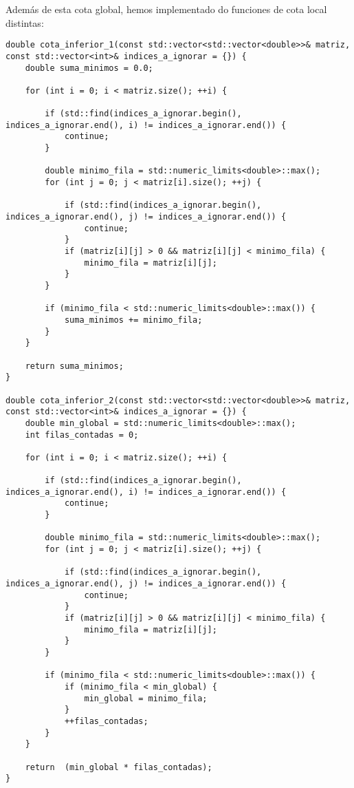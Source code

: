 \documentclass[11pt,openany]{book}
\begin{document}
Además de esta cota global, hemos implementado do funciones de cota local distintas:
\\ 
\begin{lstlisting}
double cota_inferior_1(const std::vector<std::vector<double>>& matriz, const std::vector<int>& indices_a_ignorar = {}) {
    double suma_minimos = 0.0;

    for (int i = 0; i < matriz.size(); ++i) {
        
        if (std::find(indices_a_ignorar.begin(), indices_a_ignorar.end(), i) != indices_a_ignorar.end()) {
            continue;
        }

        double minimo_fila = std::numeric_limits<double>::max();
        for (int j = 0; j < matriz[i].size(); ++j) {
            
            if (std::find(indices_a_ignorar.begin(), indices_a_ignorar.end(), j) != indices_a_ignorar.end()) {
                continue;
            }
            if (matriz[i][j] > 0 && matriz[i][j] < minimo_fila) {
                minimo_fila = matriz[i][j];
            }
        }

        if (minimo_fila < std::numeric_limits<double>::max()) {
            suma_minimos += minimo_fila;
        }
    }

    return suma_minimos;
}    

double cota_inferior_2(const std::vector<std::vector<double>>& matriz, const std::vector<int>& indices_a_ignorar = {}) {
    double min_global = std::numeric_limits<double>::max();
    int filas_contadas = 0;

    for (int i = 0; i < matriz.size(); ++i) {
        
        if (std::find(indices_a_ignorar.begin(), indices_a_ignorar.end(), i) != indices_a_ignorar.end()) {
            continue;
        }

        double minimo_fila = std::numeric_limits<double>::max();
        for (int j = 0; j < matriz[i].size(); ++j) {
            
            if (std::find(indices_a_ignorar.begin(), indices_a_ignorar.end(), j) != indices_a_ignorar.end()) {
                continue;
            }
            if (matriz[i][j] > 0 && matriz[i][j] < minimo_fila) {
                minimo_fila = matriz[i][j];
            }
        }

        if (minimo_fila < std::numeric_limits<double>::max()) {
            if (minimo_fila < min_global) {
                min_global = minimo_fila;
            }
            ++filas_contadas;
        }
    }

    return  (min_global * filas_contadas);
}
            
\end{lstlisting}
\end{document}
